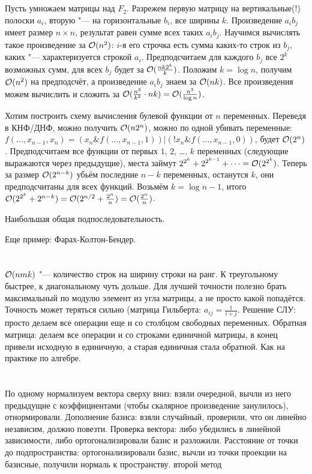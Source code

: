 \section{} %
Пусть умножаем матрицы над $F_2$.
Разрежем первую матрицу на вертикальные(!) полоски $a_i$, вторую "--- на горизонтальные $b_i$, все ширины $k$.
Произведение $a_ib_j$ имеет размер $n \times n$, результат равен сумме всех таких $a_ib_j$.
Научимся вычислять такое произведение за $\mathcal{O}(n^2)$: $i$-я его строчка есть сумма каких-то строк из $b_j$, каких "--- характеризуется строкой $a_i$.
Предподсчитаем для каждого $b_j$ все $2^k$ возможных сумм, для всех $b_j$ будет за $\mathcal{O}(\frac{nk2^k}{k})$.
Положим $k=\log n$, получим $\mathcal{O}(n^2)$ на предподсчёт, а произведение $a_ib_j$ знаем за $\mathcal{O}(nk)$.
Все произведения можем вычислить и сложить за $\mathcal{O}(\frac{n^2}{k^2} \cdot nk) = \mathcal{O}(\frac{n^3}{\log n})$.

Хотим построить схему вычисления булевой функции от $n$ переменных.
Переведя в КНФ/ДНФ, можно получить $\mathcal{O}(n2^n)$, можно по одной убивать переменные: $f(\dots, x_{n-1}, x_n) = (x_n \& f(\dots, x_{n-1}, 1)) | (!x_n \& f(\dots, x_{n-1}, 0))$, будет $\mathcal{O}(2^n)$.
Предподсчитаем все функции от первых $1$, $2$, \dots, $k$ переменных (следующие выражаются через предыдущие), места займут $2^{2^k} + 2^{2^{k-1}} + \dots = \mathcal{O}(2^{2^k})$.
Теперь за размер $\mathcal{O}(2^{n-k})$ убьём последние $n-k$ переменных, останутся $k$, они предподсчитаны для всех функций.
Возьмём $k=\log n - 1$, итого $\mathcal{O}(2^{2^k} + 2^{n-k})=\mathcal{O}(2^{n/2}+\frac{2^n}{n})=\mathcal{O}(\frac{2^n}{n})$.

\TODO Наибольшая общая подпоследовательность.

Еще пример: Фарах-Колтон-Бендер.

\section{} %
$\mathcal{O}(nmk)$ "--- количество строк на ширину строки на ранг.
К треугольному быстрее, к диагональному чуть дольше.
Для лучшей точности полезно брать максимальный по модулю элемент из угла матрицы, а не просто какой попадётся.
Точность может теряться сильно (матрица Гильберта: $a_{ij}=\frac{1}{i+j}$.
Решение СЛУ: просто делаем все операции еще и со столбцом свободных переменных.
Обратная матрица: делаем все операции и со строками единичной матрицы, в конец привели исходную в единичную, а старая единичная стала обратной.
Как на практике по алгебре.

\section{} %
По одному нормализуем вектора сверху вниз: взяли очередной, вычли из него предыдущие с коэффициентами (чтобы скалярное произведение занулилось), отнормировали.
Дополнение базиса: взяли случайный, проверили, что он линейно независим, должно повезти.
Проверка вектора: либо убедились в линейной зависимости, либо ортогонализировали базис и разложили.
Расстояние от точки до подпространства: ортогонализировали базис, вычли из точки проекции на базисные, получили нормаль к пространству.
\TODO второй метод


